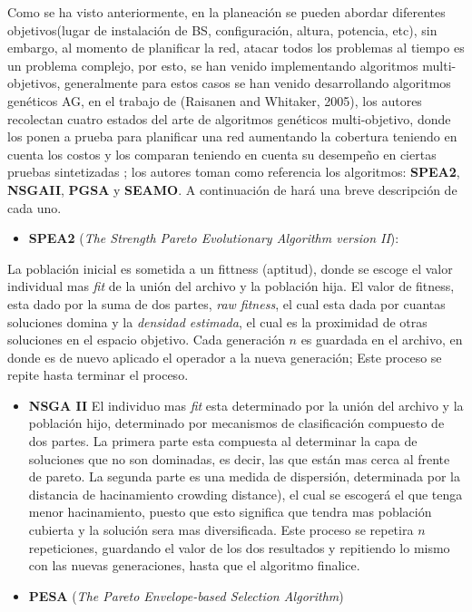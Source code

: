 \documentclass[]{article}
\providecommand{\tightlist}{%
  \setlength{\itemsep}{0pt}\setlength{\parskip}{0pt}}
\begin{document}
Como se ha visto anteriormente, en la planeación se pueden abordar
diferentes objetivos(lugar de instalación de BS, configuración, altura,
potencia, etc), sin embargo, al momento de planificar la red, atacar
todos los problemas al tiempo es un problema complejo, por esto, se han
venido implementando algoritmos multi-objetivos, generalmente para estos
casos se han venido desarrollando algoritmos genéticos AG, en el trabajo
de (Raisanen and Whitaker, 2005), los autores recolectan cuatro estados
del arte de algoritmos genéticos multi-objetivo, donde los ponen a
prueba para planificar una red aumentando la cobertura teniendo en
cuenta los costos y los comparan teniendo en cuenta su desempeño en
ciertas pruebas sintetizadas ; los autores toman como referencia los
algoritmos: \textbf{SPEA2}, \textbf{NSGAII}, \textbf{PGSA} y
\textbf{SEAMO}. A continuación de hará una breve descripción de cada
uno.

\begin{itemize}
\tightlist
\item
  \textbf{SPEA2} (\emph{The Strength Pareto Evolutionary Algorithm
  version II}):
\end{itemize}

La población inicial es sometida a un fittness (aptitud), donde se
escoge el valor individual mas \emph{fit} de la unión del archivo y la
población hija. El valor de fitness, esta dado por la suma de dos
partes, \emph{raw fitness}, el cual esta dada por cuantas soluciones
domina y la \emph{densidad estimada}, el cual es la proximidad de otras
soluciones en el espacio objetivo. Cada generación \(n\) es guardada en
el archivo, en donde es de nuevo aplicado el operador a la nueva
generación; Este proceso se repite hasta terminar el proceso.

\begin{itemize}
\item
  \textbf{NSGA II} El individuo mas \emph{fit} esta determinado por la
  unión del archivo y la población hijo, determinado por mecanismos de
  clasificación compuesto de dos partes. La primera parte esta compuesta
  al determinar la capa de soluciones que no son dominadas, es decir,
  las que están mas cerca al frente de pareto. La segunda parte es una
  medida de dispersión, determinada por la distancia de hacinamiento
  crowding distance), el cual se escogerá el que tenga menor
  hacinamiento, puesto que esto significa que tendra mas población
  cubierta y la solución sera mas diversificada. Este proceso se
  repetira \(n\) repeticiones, guardando el valor de los dos resultados
  y repitiendo lo mismo con las nuevas generaciones, hasta que el
  algoritmo finalice.
\item
  \textbf{PESA} (\emph{The Pareto Envelope-based Selection Algorithm})
\end{itemize}
\end{document}
